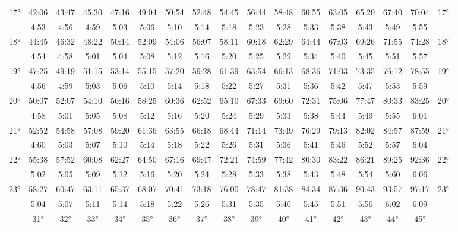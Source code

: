 \begin{scriptsize}
\begin{tabular}{c || c | c | c | c | c | c | c | c | c | c | c | c | c | c | c || c}
		\multirow{2}{*}{17°}&42:06&43:47&45:30&47:16&49:04&50:54&52:48&54:45&56:44&58:48&60:55&63:05&65:20&67:40&70:04&\multirow{2}{*}{17°}\\ \space&4:53&4:56&4:59&5:03&5:06&5:10&5:14&5:18&5:23&5:28&5:33&5:38&5:43&5:49&5:55&\space\\\hline
		\multirow{2}{*}{18°}&44:45&46:32&48:22&50:14&52:09&54:06&56:07&58:11&60:18&62:29&64:44&67:03&69:26&71:55&74:28&\multirow{2}{*}{18°}\\ \space&4:54&4:58&5:01&5:04&5:08&5:12&5:16&5:20&5:25&5:29&5:34&5:40&5:45&5:51&5:57&\space\\\hline
		\multirow{2}{*}{19°}&47:25&49:19&51:15&53:14&55:15&57:20&59:28&61:39&63:54&66:13&68:36&71:03&73:35&76:12&78:55&\multirow{2}{*}{19°}\\ \space&4:56&4:59&5:03&5:06&5:10&5:14&5:18&5:22&5:27&5:31&5:36&5:42&5:47&5:53&5:59&\space\\\hline
		\multirow{2}{*}{20°}&50:07&52:07&54:10&56:16&58:25&60:36&62:52&65:10&67:33&69:60&72:31&75:06&77:47&80:33&83:25&\multirow{2}{*}{20°}\\ \space&4:58&5:01&5:05&5:08&5:12&5:16&5:20&5:24&5:29&5:33&5:38&5:44&5:49&5:55&6:01&\space\\\hline
		\multirow{2}{*}{21°}&52:52&54:58&57:08&59:20&61:36&63:55&66:18&68:44&71:14&73:49&76:29&79:13&82:02&84:57&87:59&\multirow{2}{*}{21°}\\ \space&4:60&5:03&5:07&5:10&5:14&5:18&5:22&5:26&5:31&5:36&5:41&5:46&5:52&5:57&6:04&\space\\\hline
		\multirow{2}{*}{22°}&55:38&57:52&60:08&62:27&64:50&67:16&69:47&72:21&74:59&77:42&80:30&83:22&86:21&89:25&92:36&\multirow{2}{*}{22°}\\ \space&5:02&5:05&5:09&5:12&5:16&5:20&5:24&5:28&5:33&5:38&5:43&5:48&5:54&5:60&6:06&\space\\\hline
		\multirow{2}{*}{23°}&58:27&60:47&63:11&65:37&68:07&70:41&73:18&76:00&78:47&81:38&84:34&87:36&90:43&93:57&97:17&\multirow{2}{*}{23°}\\ \space&5:04&5:07&5:11&5:14&5:18&5:22&5:26&5:31&5:35&5:40&5:45&5:51&5:56&6:02&6:09&\space\\\hline
		\hline\space &31°&32°&33°&34°&35°&36°&37°&38°&39°&40°&41°&42°&43°&44°&45°
\end{tabular}\end{scriptsize}

